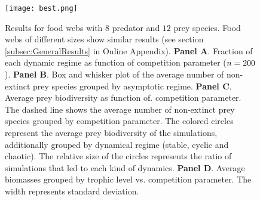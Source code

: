 \begin{figure}
	\begin{center}
		\texttt{[image: best.png]}
	\end{center}
	\caption{Results for food webs with $8$ predator and $12$ prey species. Food webs of different sizes show similar results (see section \ref{subsec:GeneralResults} in Online Appendix). \textbf{Panel A}. Fraction of each dynamic regime as function of competition parameter ($n = 200$). \textbf{Panel B}. Box and whisker plot of the average number of non-extinct prey species grouped by asymptotic regime. \textbf{Panel C}. Average prey biodiversity as function of. competition parameter. The dashed line shows the average number of non-extinct prey species grouped by competition parameter. The colored circles represent the average prey biodiversity of the simulations, additionally grouped by dynamical regime (stable, cyclic and chaotic). The relative size of the circles represents the ratio of simulations that led to each kind of dynamics. \textbf{Panel D}. Average biomasses grouped by trophic level vs. competition parameter. The width represents standard deviation.}
	\label{fig:Biodiversity}
\end{figure}
